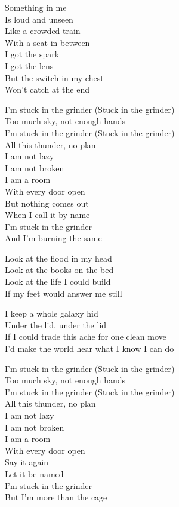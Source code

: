 \begin{lyrics}
Something in me\\
Is loud and unseen\\
Like a crowded train\\
With a seat in between\\
I got the spark\\
I got the lens\\
But the switch in my chest\\
Won’t catch at the end

I’m stuck in the grinder
(Stuck in the grinder)\\
Too much sky, not enough hands\\
I’m stuck in the grinder
(Stuck in the grinder)\\
All this thunder, no plan\\
I am not lazy\\
I am not broken\\
I am a room\\
With every door open\\
But nothing comes out\\
When I call it by name\\
I’m stuck in the grinder\\
And I’m burning the same

Look at the flood in my head\\
Look at the books on the bed\\
Look at the life I could build\\
If my feet would answer me still

I keep a whole galaxy hid\\
Under the lid, under the lid\\
If I could trade this ache for one clean move\\
I’d make the world hear what I know I can do

I’m stuck in the grinder
(Stuck in the grinder)\\
Too much sky, not enough hands\\
I’m stuck in the grinder
(Stuck in the grinder)\\
All this thunder, no plan\\
I am not lazy\\
I am not broken\\
I am a room\\
With every door open\\
Say it again\\
Let it be named\\
I’m stuck in the grinder\\
But I’m more than the cage
\end{lyrics}

